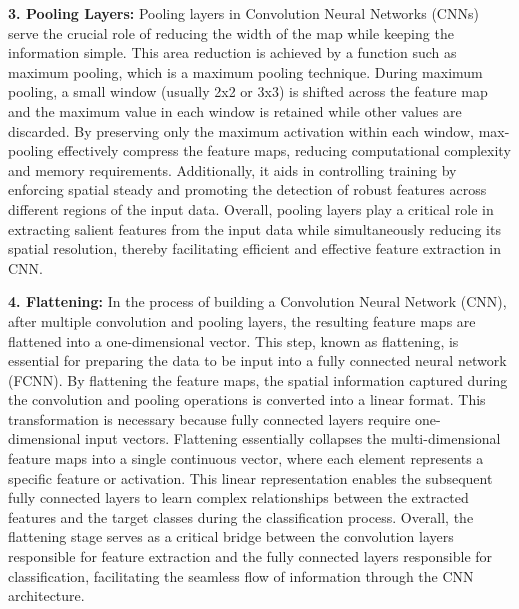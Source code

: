\textbf{3. Pooling Layers:}
Pooling layers in Convolution Neural Networks (CNNs) serve the crucial role of reducing the width of the map while keeping the information simple. This area reduction is achieved by a function such as maximum pooling, which is a maximum pooling technique. During maximum pooling, a small window (usually 2x2 or 3x3) is shifted across the feature map and the maximum value in each window is retained while other values are discarded. By preserving only the maximum activation within each window, max-pooling effectively compress the feature maps, reducing computational complexity and memory requirements. Additionally, it aids in controlling training by enforcing spatial steady and promoting the detection of robust features across different regions of the input data. Overall, pooling layers play a critical role in extracting salient features from the input data while simultaneously reducing its spatial resolution, thereby facilitating efficient and effective feature extraction in CNN.


\textbf{4. Flattening:}
In the process of building a Convolution Neural Network (CNN), after multiple convolution and pooling layers, the resulting feature maps are flattened into a one-dimensional vector. This step, known as flattening, is essential for preparing the data to be input into a fully connected neural network (FCNN). By flattening the feature maps, the spatial information captured during the convolution and pooling operations is converted into a linear format. This transformation is necessary because fully connected layers require one-dimensional input vectors. Flattening essentially collapses the multi-dimensional feature maps into a single continuous vector, where each element represents a specific feature or activation. This linear representation enables the subsequent fully connected layers to learn complex relationships between the extracted features and the target classes during the classification process. Overall, the flattening stage serves as a critical bridge between the convolution layers responsible for feature extraction and the fully connected layers responsible for classification, facilitating the seamless flow of information through the CNN architecture.
\\

